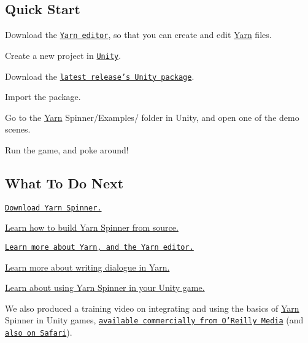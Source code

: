 \subsection*{Quick Start}


\begin{DoxyEnumerate}
\item Download the \href{https://github.com/InfiniteAmmoInc/Yarn}{\tt Yarn editor}, so that you can create and edit \hyperlink{a00040}{Yarn} files.
\end{DoxyEnumerate}
\begin{DoxyEnumerate}
\item Create a new project in \href{https://unity3d.com/get-unity}{\tt Unity}.
\item Download the \href{https://github.com/thesecretlab/YarnSpinner/releases}{\tt latest release's Unity package}.
\item Import the package.
\item Go to the {\ttfamily \hyperlink{a00040}{Yarn} Spinner/\-Examples/} folder in Unity, and open one of the demo scenes.
\item Run the game, and poke around!
\end{DoxyEnumerate}

\subsection*{What To Do Next}


\begin{DoxyItemize}
\item \href{https://github.com/thesecretlab/YarnSpinner/releases}{\tt Download Yarn Spinner.}
\item \hyperlink{a00018}{Learn how to build Yarn Spinner from source.}
\item \href{https://github.com/infiniteammoinc/Yarn}{\tt Learn more about Yarn, and the Yarn editor.}
\item \hyperlink{a00012}{Learn more about writing dialogue in Yarn.}
\item \hyperlink{a00024}{Learn about using Yarn Spinner in your Unity game.}
\end{DoxyItemize}

\href{http://shop.oreilly.com/product/0636920055105.do}{\tt }

We also produced a training video on integrating and using the basics of \hyperlink{a00040}{Yarn} Spinner in Unity games, \href{http://shop.oreilly.com/product/0636920055105.do}{\tt available commercially from O'Reilly Media} (and \href{https://www.safaribooksonline.com/library/view/creating-narrative-games/9781491969830/}{\tt also on Safari}).

